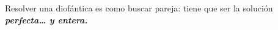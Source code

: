 \begin{capitulobox}
Resolver una diofántica es como buscar pareja: tiene que ser la solución \textbf{\textit{perfecta… y entera.}}
\end{capitulobox}

